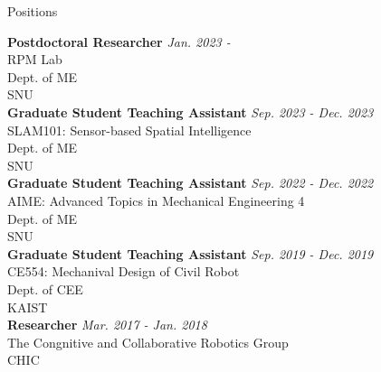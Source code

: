 \begin{rSection}{Positions}

{\bf Postdoctoral Researcher} \hfill {\em Jan. 2023 -} \\
\acf{RPM} Lab \\ 
Dept. of \acf{ME} \\
\acf{SNU}\\

{\bf Graduate Student Teaching Assistant} \hfill {\em Sep. 2023 - Dec. 2023} \\
SLAM101: Sensor-based Spatial Intelligence \\ 
Dept. of \acf{ME} \\
\acf{SNU}\\

{\bf Graduate Student Teaching Assistant} \hfill {\em Sep. 2022 - Dec. 2022} \\
AIME: Advanced Topics in Mechanical Engineering 4 \\ 
Dept. of \acf{ME} \\
\acf{SNU}\\

{\bf Graduate Student Teaching Assistant} \hfill {\em Sep. 2019 - Dec. 2019} \\
CE554: Mechanival Design of Civil Robot \\ 
Dept. of \acf{CEE} \\
\acf{KAIST}\\

{\bf Researcher} \hfill {\em Mar. 2017 - Jan. 2018} \\
The Congnitive and Collaborative Robotics Group\\
\acf{CHIC}\\


\end{rSection}

